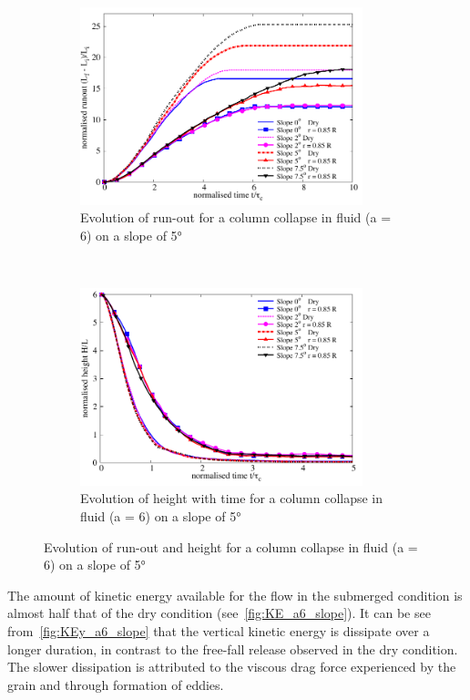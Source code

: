 \begin{figure}
\centering
\begin{subfigure}[t]{0.9\textwidth}
\includegraphics[width=0.9\textwidth]{Runout_a6_slope}
\caption{Evolution of run-out for a column collapse in fluid (a = 6) on a 
slope of 5\si{\degree}}
\label{fig:Runout_a6_slope}
\end{subfigure} \\
\begin{subfigure}[t]{0.9\textwidth}
\centering
\includegraphics[width=0.9\textwidth]{Height_a6_slope}
\caption{Evolution of height with time for a column collapse in fluid (a = 6) 
on a slope of 5\si{\degree}}
\label{fig:Height_a6_slope}
\end{subfigure}
\caption{Evolution of  run-out and height  for a column collapse in fluid (a = 
6) on a slope of 5\si{\degree}}
\label{fig:a6_slope}
\end{figure}

The amount of kinetic energy available for the flow in the submerged condition 
is almost half that of the dry condition (see~\cref{fig:KE_a6_slope}). It can 
be see from~\cref{fig:KEy_a6_slope} that the vertical kinetic energy is 
dissipate over a longer duration, in contrast to the free-fall release observed 
in the dry condition. The slower dissipation is attributed to the viscous drag 
force experienced by the grain and through formation of eddies. 

